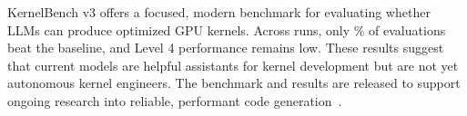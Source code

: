 KernelBench v3 offers a focused, modern benchmark for evaluating whether LLMs can produce optimized GPU kernels. Across \TotalEvals{} runs, only \OverallBeatRate\% of evaluations beat the baseline, and Level 4 performance remains low. These results suggest that current models are helpful assistants for kernel development but are not yet autonomous kernel engineers. The benchmark and results are released to support ongoing research into reliable, performant code generation~\cite{kernelbench-v3-repo}.

